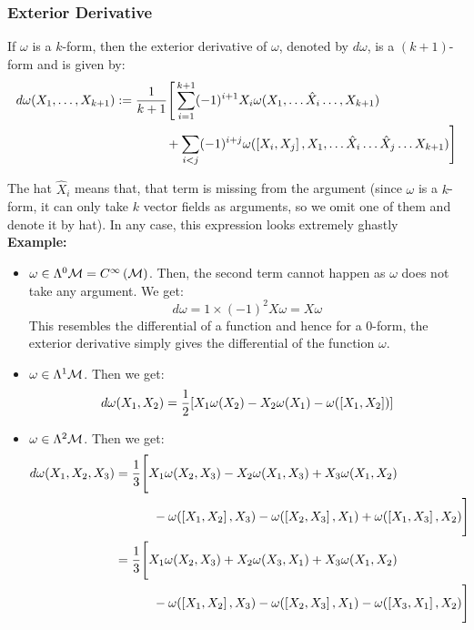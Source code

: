 \subsubsection{Exterior Derivative}
\begin{definition}
    If $\omega$ is a $k$-form, then the exterior derivative of $\omega$, denoted by $d\omega$, is a $(k+1)$-form and is given by:
    \begin{align*}
        d\omega (X_1,\ldots, X_{k+1})&:=\frac{1}{k+1}\Bigg[\sum\limits_{i=1}^{k+1} (-1)^{i+1}X_i \omega(X_1,\ldots \hat{X}_i\ldots,X_{k+1})\\&\qquad\qquad+\sum\limits_{i<j}(-1)^{i+j}\omega(\left[ X_i, X_j \right],X_1,\ldots \hat{X}_i\ldots \hat{X}_j \ldots X_{k+1})\Bigg]
    \end{align*}
\end{definition}
The hat $\hat{X}_i$ means that, that term is missing from the argument (since $\omega$ is a $k$-form, it can only take $k$ vector fields as arguments, so we omit one of them and denote it by hat). In any case, this expression looks extremely ghastly \\[0.2cm]
\textbf{Example:}\\[0.2cm]
\begin{itemize}
    \item $\omega \in \Lambda^0\mathcal M = C^{\infty}\left(\mathcal M\right)$. Then, the second term cannot happen as $\omega$ does not take any argument. We get:
    $$d\omega = 1\times (-1)^{2}X\omega = X\omega$$
    This resembles the differential of a function and hence for a $0$-form, the exterior derivative simply gives the differential of the function $\omega$.
    \item $\omega \in \Lambda^1\mathcal M$. Then we get:
    $$d\omega(X_1, X_2) = \frac{1}{2}\qty[X_1\omega(X_2) - X_2\omega(X_1) -\omega(\left[ X_1, X_2 \right])]$$
\item $\omega \in \Lambda^2\mathcal M$. Then we get:
\begin{align*}
    d\omega(X_1, X_2,X_3) &= \frac{1}{3}\Bigg[X_1\omega(X_2,X_3) -X_2\omega(X_1,X_3)+X_3\omega(X_1,X_2)\\&\qquad\quad -\omega(\left[ X_1, X_2 \right], X_3)-\omega(\left[ X_2, X_3 \right], X_1) + \omega(\left[ X_1, X_3 \right], X_2)\Bigg]\\
    &= \frac{1}{3}\Bigg[X_1\omega(X_2,X_3) +X_2\omega(X_3,X_1)+X_3\omega(X_1,X_2)\\&\qquad\quad -\omega(\left[ X_1, X_2 \right], X_3)-\omega(\left[ X_2, X_3 \right], X_1) - \omega(\left[ X_3, X_1 \right], X_2)\Bigg]
\end{align*}
\end{itemize}
